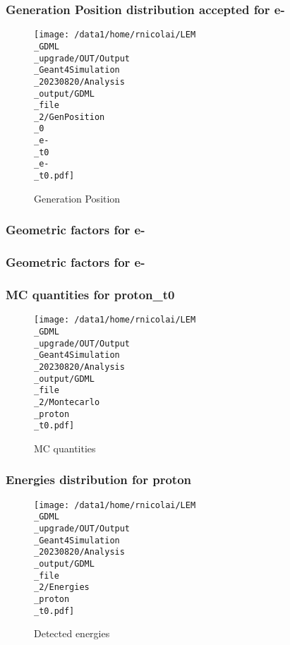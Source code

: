 \documentclass[8pt]{beamer}
\begin{document}
            \begin{frame}
                \frametitle{Generation Position distribution accepted for e-}
            
        \begin{figure}[h]
            \centering
            \texttt{[image: /data1/home/rnicolai/LEM\\\_GDML\\\_upgrade/OUT/Output\\\_Geant4Simulation\\\_20230820/Analysis\\\_output/GDML\\\_file\\\_2/GenPosition\\\_0\\\_e-\\\_t0\\\_e-\\\_t0.pdf]}
            \caption{Generation Position}
        \end{figure}
        
            \end{frame}
            
            \begin{frame}
                \frametitle{Geometric factors for e-}
            
            \end{frame}
            
            \begin{frame}
                \frametitle{Geometric factors for e-}
            
            \end{frame}
            
            \begin{frame}
                \frametitle{MC quantities for proton\_t0}
            
        \begin{figure}[h]
            \centering
            \texttt{[image: /data1/home/rnicolai/LEM\\\_GDML\\\_upgrade/OUT/Output\\\_Geant4Simulation\\\_20230820/Analysis\\\_output/GDML\\\_file\\\_2/Montecarlo\\\_proton\\\_t0.pdf]}
            \caption{MC quantities}
        \end{figure}
        
            \end{frame}
            
            \begin{frame}
                \frametitle{Energies distribution for proton}
            
        \begin{figure}[h]
            \centering
            \texttt{[image: /data1/home/rnicolai/LEM\\\_GDML\\\_upgrade/OUT/Output\\\_Geant4Simulation\\\_20230820/Analysis\\\_output/GDML\\\_file\\\_2/Energies\\\_proton\\\_t0.pdf]}
            \caption{Detected energies}
        \end{figure}
        
            \end{frame}
            
\end{document}
